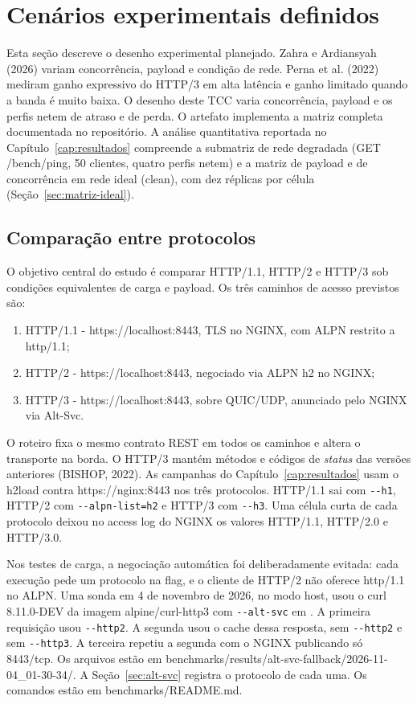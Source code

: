 \section{Cenários experimentais definidos}

Esta seção descreve o desenho experimental planejado. Zahra e Ardiansyah (2026) variam concorrência, payload e condição de rede. Perna et al. (2022) mediram ganho expressivo do HTTP/3 em alta latência e ganho limitado quando a banda é muito baixa. O desenho deste TCC varia concorrência, payload e os perfis netem de atraso e de perda. O artefato implementa a matriz completa documentada no repositório. A análise quantitativa reportada no Capítulo~\ref{cap:resultados} compreende a submatriz de rede degradada (GET /bench/ping, 50 clientes, quatro perfis netem) e a matriz de payload e de concorrência em rede ideal (clean), com dez réplicas por célula (Seção~\ref{sec:matriz-ideal}).

\subsection{Comparação entre protocolos}

O objetivo central do estudo é comparar HTTP/1.1, HTTP/2 e HTTP/3 sob condições equivalentes de carga e payload. Os três caminhos de acesso previstos são:

\begin{enumerate}[label=\alph*)]
\item HTTP/1.1 - https://localhost:8443, TLS no NGINX, com ALPN restrito a http/1.1;
\item HTTP/2 - https://localhost:8443, negociado via ALPN h2 no NGINX;
\item HTTP/3 - https://localhost:8443, sobre QUIC/UDP, anunciado pelo NGINX via Alt-Svc.
\end{enumerate}

O roteiro fixa o mesmo contrato REST em todos os caminhos e altera o transporte na borda. O HTTP/3 mantém métodos e códigos de \textit{status} das versões anteriores (BISHOP, 2022). As campanhas do Capítulo~\ref{cap:resultados} usam o h2load contra https://nginx:8443 nos três protocolos. HTTP/1.1 sai com \texttt{-{}-h1}, HTTP/2 com \texttt{-{}-alpn-list=h2} e HTTP/3 com \texttt{-{}-h3}. Uma célula curta de cada protocolo deixou no access log do NGINX os valores HTTP/1.1, HTTP/2.0 e HTTP/3.0.

Nos testes de carga, a negociação automática foi deliberadamente evitada: cada execução pede um protocolo na flag, e o cliente de HTTP/2 não oferece http/1.1 no ALPN. Uma sonda em 4 de novembro de 2026, no modo host, usou o curl 8.11.0-DEV da imagem alpine/curl-http3 com \texttt{-{}-alt-svc} em . A primeira requisição usou \texttt{-{}-http2}. A segunda usou o cache dessa resposta, sem \texttt{-{}-http2} e sem \texttt{-{}-http3}. A terceira repetiu a segunda com o NGINX publicando só 8443/tcp. Os arquivos estão em benchmarks/results/alt-svc-fallback/2026-11-04\_01-30-34/. A Seção~\ref{sec:alt-svc} registra o protocolo de cada uma. Os comandos estão em benchmarks/README.md.

